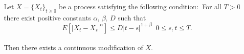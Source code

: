 \documentclass[12pt]{article}
\begin{document}
Let $X=\lbrace X_t \rbrace_{t\geq 0}$ be a process satisfying the following condition$\colon$
For all $T>0$ there exist positive constants $\alpha$, $\beta$, $D$ such that  
$$ E[|X_t-X_s|^{\alpha}]\leq D|t-s|^{1+\beta} \,\,\ 0\leq s, t\leq T.$$
\\Then there exists a continuous modification of $X$.
\end{document}
